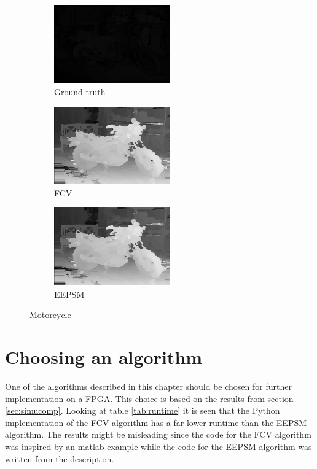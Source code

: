 \begin{figure}[ht]
  \centering
  \begin{subfigure}[t]{0.3\textwidth}
    \centering\includegraphics[width=5cm]{figures/mot_GT}
    \caption{Ground truth \cite{Scharstein2014 (Is dark due to scaling)} \label{fig:mot_gt}}
  \end{subfigure}\hspace{0.5cm}
  \begin{subfigure}[t]{0.3\textwidth}
    \centering\includegraphics[width=5cm]{figures/mot_fcv}
    \caption{FCV\label{fig:mot_fcv}}
  \end{subfigure}\hspace{0.5cm}
  \begin{subfigure}[t]{0.3\textwidth}
    \centering\includegraphics[width=5cm]{figures/mot_fcv}
    \caption{EEPSM\label{fig:mot_eepsm}}
  \end{subfigure}
  \caption{Motorcycle\label{fig:motall}}
\end{figure}

\section{Choosing an algorithm}
One of the algorithms described in this chapter should be chosen for further implementation on a FPGA. This choice is based on the results from section \vref{sec:simucomp}. Looking at table \ref{tab:runtime} it is seen that the Python implementation of the FCV algorithm has a far lower runtime than the EEPSM algorithm. The results might be misleading since the code for the FCV algorithm was inspired by an matlab example while the code for the EEPSM algorithm was written from the description.\\

